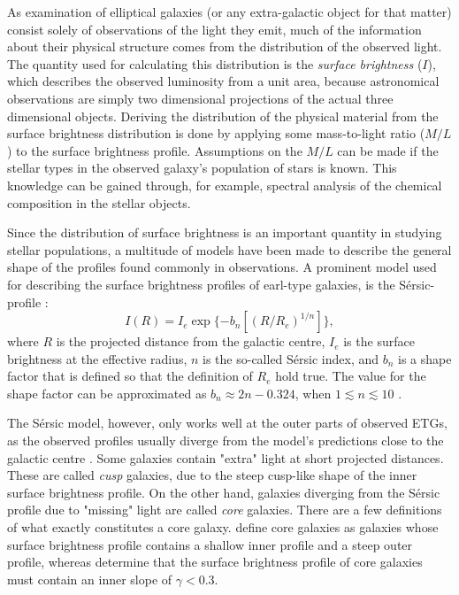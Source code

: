 \documentclass[english, oneside]{HYgradu}
\begin{document}
As examination of elliptical galaxies (or any extra-galactic object for that matter) consist solely of observations of the light they emit, much of the information about their physical structure comes from the distribution of the observed light. The quantity used for calculating this distribution is the \textit{surface brightness} ($I$), which describes the observed luminosity from a unit area, because astronomical observations are simply two dimensional projections of the actual three dimensional objects. Deriving the distribution of the physical material from the surface brightness distribution is done by applying some mass-to-light ratio ($M/L$) to the surface brightness profile. Assumptions on the $M/L$ can be made if the stellar types in the observed galaxy's population of stars is known. This knowledge can be
gained through, for example, spectral analysis of the chemical composition in the stellar objects.

Since the distribution of surface brightness is an important quantity in studying stellar populations, a multitude of models have been made to describe the general shape of the profiles found commonly in observations. A prominent model used for describing the surface brightness profiles of earl-type galaxies, is the Sérsic-profile \citep{Sersic1968}:
\begin{equation}
I (R) = I_e \exp \{ -b_n \left[ (R / R_e)^{1/n} \right] \},
\end{equation}
where $R$ is the projected distance from the galactic centre, $I_e$ is the surface brightness at the effective radius, $n$ is the so-called Sérsic index, and $b_n$ is a shape factor that is defined so that the definition of $R_e$ hold true. The value for the shape factor can be approximated as $b_n \approx 2n - 0.324$, when $1 \lesssim n \lesssim 10$ \citep{BinneyTremaine}.

The Sérsic model, however, only works well at the outer parts of observed ETGs, as the observed profiles usually diverge from the model's predictions close to the galactic centre \citep{Kormendy2009}. Some galaxies contain "extra" light at short projected distances. These are called \textit{cusp} galaxies, due to the steep cusp-like shape of the inner surface brightness profile. On the other hand, galaxies diverging from the Sérsic profile due to "missing" light are called \textit{core} galaxies. There are a few definitions of what exactly constitutes a core galaxy. \cite{Kormendy1999} define core galaxies as galaxies whose surface brightness profile contains a shallow inner profile and a steep outer profile, whereas \cite{Lauer1995} determine that the surface brightness profile of core galaxies must contain an inner slope of $\gamma < 0.3$. 
\end{document}
